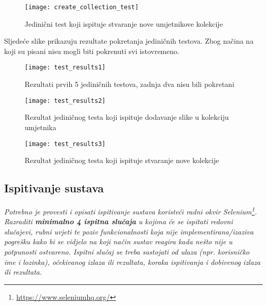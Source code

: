 {				\begin{figure}[H]
					
					\texttt{[image: create\_collection\_test]}
					\caption{Jedinični test koji ispituje stvaranje nove umjetnikove kolekcije}
					
				\end{figure}
			
			{Sljedeće slike prikazuju rezultate pokretanja jediničnih testova. Zbog načina na koji su pisani nisu mogli biti pokrenuti svi istovremeno.}
				\begin{figure}[H]
					
					\texttt{[image: test\_results1]}
					\caption{Rezultati prvih 5 jediničnih testova, zadnja dva nisu bili pokretani}
					
				\end{figure}
			
				\begin{figure}[H]
					
					\texttt{[image: test\_results2]}
					\caption{Rezultat jediničnog testa koji ispituje dodavanje slike u kolekciju umjetnika}
					
				\end{figure}
				
				\begin{figure}[H]
					
					\texttt{[image: test\_results3]}
					\caption{Rezultat jediničnog testa koji ispituje stvaranje nove kolekcije}
					
				\end{figure}
			
			\eject	
			
			\subsection{Ispitivanje sustava}
			
			 \textit{Potrebno je provesti i opisati ispitivanje sustava koristeći radni okvir Selenium\footnote{\url{https://www.seleniumhq.org/}}. Razraditi \textbf{minimalno 4 ispitna slučaja} u kojima će se ispitati redovni slučajevi, rubni uvjeti te poziv funkcionalnosti koja nije implementirana/izaziva pogrešku kako bi se vidjelo na koji način sustav reagira kada nešto nije u potpunosti ostvareno. Ispitni slučaj se treba sastojati od ulaza (npr. korisničko ime i lozinka), očekivanog izlaza ili rezultata, koraka ispitivanja i dobivenog izlaza ili rezultata.\\ }
			 
}
